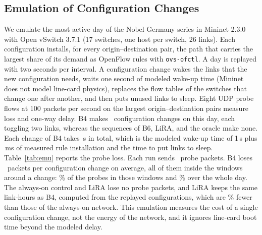 \documentclass[journal]{IEEEtran}
\begin{document}
\begin{table}[t]
\centering
\caption{Rolling-Origin Folds (Mean over Four Folds, Default Price)}
\label{tab:folds}
\footnotesize
\setlength{\tabcolsep}{3pt}

\end{table}

\subsection{Emulation of Configuration Changes}\label{sec:res-emu}

We emulate the most active day of the Nobel-Germany series in Mininet 2.3.0 with Open vSwitch 3.7.1 (17 switches, one host per switch, 26 links). Each configuration installs, for every origin--destination pair, the path that carries the largest share of its demand as OpenFlow rules with \texttt{ovs-ofctl}. A day is replayed with two seconds per interval. A configuration change wakes the links that the new configuration needs, waits one second of modeled wake-up time (Mininet does not model line-card physics), replaces the flow tables of the switches that change one after another, and then puts unused links to sleep. Eight UDP probe flows at 100 packets per second on the largest origin--destination pairs measure loss and one-way delay. B4 makes \emuTrans\ configuration changes on this day, each toggling two links, whereas the sequences of B6, LiRA, and the oracle make none. Each change of B4 takes \emuTransS\,s in total, which is the modeled wake-up time of 1\,s plus \emuRuleMs\,ms of measured rule installation and the time to put links to sleep. Table~\ref{tab:emu} reports the probe loss. Each run sends \emuProbePkts\ probe packets. B4 loses \emuLostPerTrans\ packets per configuration change on average, all of them inside the windows around a change: \emuLossWin\% of the probes in those windows and \emuLossAll\% over the whole day. The always-on control and LiRA lose no probe packets, and LiRA keeps the same link-hours as B4, computed from the replayed configurations, which are \emuLinkSave\% fewer than those of the always-on network. This emulation measures the cost of a single configuration change, not the energy of the network, and it ignores line-card boot time beyond the modeled delay.

\begin{table}[t]
\centering
\caption{Mininet Emulation of the Most Active Day of Nobel-Germany. Trans.: Configuration Changes. Loss in Windows Counts Probes Sent from 0.2\,s Before a Change Starts to 1\,s After It Ends. Link-Hours Are Computed from the Replayed Configurations}
\label{tab:emu}
\footnotesize
\setlength{\tabcolsep}{4pt}

\end{table}
\end{document}
